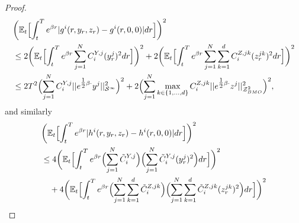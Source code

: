 \documentclass[10pt,a4paper]{article}
\theoremstyle{plain}
\theoremstyle{definition}
\numberwithin{equation}{section}
\begin{document}
\begin{proof}
\begin{align}
&\biggr(\mathbb{E}_{t}\Bigl[\int_{t}^{T}e^{\beta r}|g^{i}(r,y_{r},z_{r})-g^{i}(r,0,0)|dr\Bigr]\biggr)^{2} \nonumber \\
&\leq 2\biggr(\mathbb{E}_{t}\Bigl[\int_{t}^{T}e^{\beta r}\sum_{j=1}^{N}C_{i}^{Y,j}(y_{r}^{j})^{2}dr\Bigr]\biggr)^{2} + 2\biggr(\mathbb{E}_{t}\Bigl[\int_{t}^{T}e^{\beta r}\sum_{j=1}^{N}\sum_{k=1}^{d}C_{i}^{Z,jk}(z_{r}^{jk})^{2}dr\Bigr]\biggr)^{2} \nonumber \\
&\leq 2T^{2}\Bigl(\sum_{j=1}^{N}C_{i}^{Y,j}||e^{\tfrac{1}{2}\beta\cdot}y^{j}||_{\mathcal{S}^{\infty}}^{2}\Bigr)^{2} + 2\Bigl(\sum_{j=1}^{N}\max_{k \in \{1,...,d\}}C_{i}^{Z,jk}||e^{\tfrac{1}{2}\beta \cdot}z^{j}||_{\mathcal{Z}_{BMO}^{2}}^{2}\Bigr)^{2}, \label{equ:misc2}
\end{align}
and similarly
\begin{align}
&\biggr(\mathbb{E}_{t}\Bigl[\int_{t}^{T}e^{\beta r}|h^{i}(r,y_{r},z_{r})-h^{i}(r,0,0)|dr\Bigr]\biggr)^{2} \nonumber \\
&\leq 4\biggr(\mathbb{E}_{t}\Bigl[\int_{t}^{T}e^{\beta r}\Bigl(\sum_{j=1}^{N}\tilde{C}_{i}^{Y,j}\Bigr)\Bigl(\sum_{j=1}^{N}\tilde{C}_{i}^{Y,j}(y_{r}^{j})^{2}\Bigr)dr\Bigr]\biggr)^{2} \nonumber \\
&\ \ \ +4\biggr(\mathbb{E}_{t}\Bigl[\int_{t}^{T}e^{\beta r}\Bigl(\sum_{j=1}^{N}\sum_{k=1}^{d}\tilde{C}_{i}^{Z,jk}\Bigr)\Bigl(\sum_{j=1}^{N}\sum_{k=1}^{d}\tilde{C}_{i}^{Z,jk}(z_{r}^{jk})^{2}\Bigr)dr\Bigr]\biggr)^{2} \nonumber \\

\end{align}
\end{proof}
\end{document}
